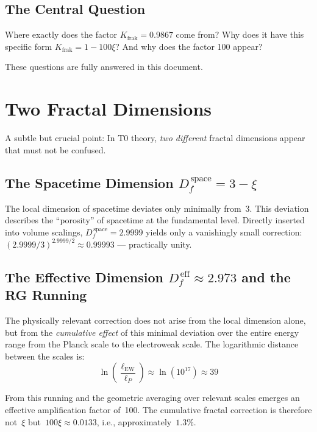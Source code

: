 	\subsection{The Central Question}
	
	Where exactly does the factor $K_{\text{frak}} = 0.9867$ come from? Why does it have this specific form $K_{\text{frak}} = 1 - 100\xi$? And why does the factor 100 appear?
	
	These questions are fully answered in this document.
	
	\section{Two Fractal Dimensions}
	
	A subtle but crucial point: In T0 theory, \emph{two different} fractal dimensions appear that must not be confused.
	
	\subsection{The Spacetime Dimension $D_f^{\,\text{space}} = 3 - \xi$}
	
	The local dimension of spacetime deviates only minimally from~3. This deviation describes the ``porosity'' of spacetime at the fundamental level. Directly inserted into volume scalings, $D_f^{\,\text{space}} = 2.9999$ yields only a vanishingly small correction: $(2.9999/3)^{2.9999/2} \approx 0.99993$ --- practically unity.
	
	\subsection{The Effective Dimension $D_f^{\,\text{eff}} \approx 2.973$ and the RG Running}
	
	The physically relevant correction does not arise from the local dimension alone, but from the \emph{cumulative effect} of this minimal deviation over the entire energy range from the Planck scale to the electroweak scale. The logarithmic distance between the scales is:
	\begin{equation}
		\ln\!\left(\frac{\ell_{\text{EW}}}{\ell_P}\right) \approx \ln(10^{17}) \approx 39
	\end{equation}
	
	From this running and the geometric averaging over relevant scales emerges an effective amplification factor of~100. The cumulative fractal correction is therefore not~$\xi$ but~$100\xi \approx 0.0133$, i.e., approximately~$1.3\%$.
	
